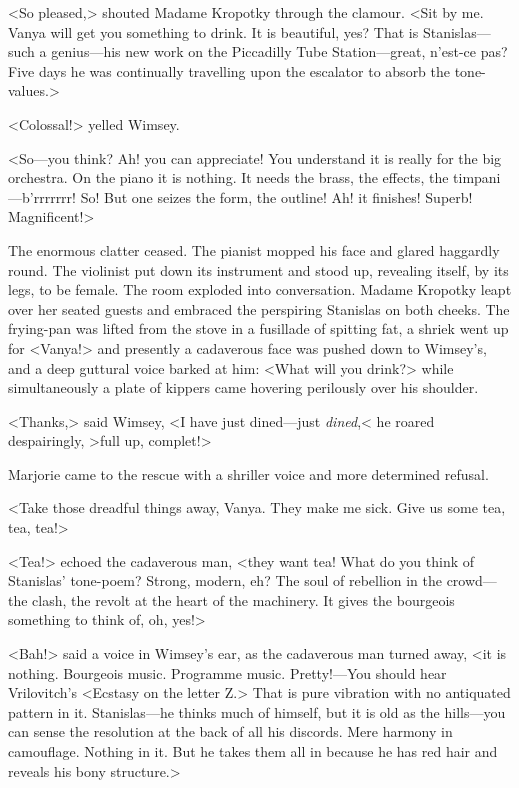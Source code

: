 <So pleased,> shouted Madame Kropotky through the clamour. <Sit by me. Vanya will get you something to drink. It is beautiful, yes? That is Stanislas—such a genius—his new work on the Piccadilly Tube Station—great, n'est-ce pas? Five days he was continually travelling upon the escalator to absorb the tone-values.>

<Colossal!> yelled Wimsey.

<So—you think? Ah! you can appreciate! You understand it is really for the big orchestra. On the piano it is nothing. It needs the brass, the effects, the timpani—b'rrrrrrr! So! But one seizes the form, the outline! Ah! it finishes! Superb! Magnificent!>

The enormous clatter ceased. The pianist mopped his face and glared haggardly round. The violinist put down its instrument and stood up, revealing itself, by its legs, to be female. The room exploded into conversation. Madame Kropotky leapt over her seated guests and embraced the perspiring Stanislas on both cheeks. The frying-pan was lifted from the stove in a fusillade of spitting fat, a shriek went up for <Vanya!> and presently a cadaverous face was pushed down to Wimsey's, and a deep guttural voice barked at him: <What will you drink?> while simultaneously a plate of kippers came hovering perilously over his shoulder.

<Thanks,> said Wimsey, <I have just dined—just \emph{dined},< he roared despairingly, >full up, complet!>

Marjorie came to the rescue with a shriller voice and more determined refusal.

<Take those dreadful things away, Vanya. They make me sick. Give us some tea, tea, tea!>

<Tea!> echoed the cadaverous man, <they want tea! What do you think of Stanislas' tone-poem? Strong, modern, eh? The soul of rebellion in the crowd—the clash, the revolt at the heart of the machinery. It gives the bourgeois something to think of, oh, yes!>

<Bah!> said a voice in Wimsey's ear, as the cadaverous man turned away, <it is nothing. Bourgeois music. Programme music. Pretty!—You should hear Vrilovitch's <Ecstasy on the letter Z\@.> That is pure vibration with no antiquated pattern in it. Stanislas—he thinks much of himself, but it is old as the hills—you can sense the resolution at the back of all his discords. Mere harmony in camouflage. Nothing in it. But he takes them all in because he has red hair and reveals his bony structure.>

